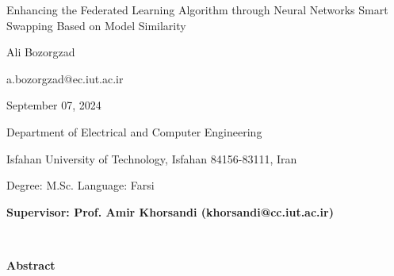 \thispagestyle{empty}

\begin{latin}
\begin{center}

{\huge
Enhancing the Federated Learning Algorithm through Neural Networks Smart Swapping Based on Model Similarity
}

\vspace{1cm}

{\LARGE{Ali Bozorgzad}}

\vspace{0.2cm}

{\small a.bozorgzad@ec.iut.ac.ir}

\vspace{0.5cm}

September 07, 2024

\vspace{0.5cm}

Department of Electrical and Computer Engineering

\vspace{0.2cm}

Isfahan University of Technology, Isfahan 84156-83111, Iran

\vspace{0.2cm}

Degree: M.Sc. \hspace*{3cm} Language: Farsi

\vspace{1cm}

{\small\textbf{Supervisor: Prof. Amir Khorsandi (khorsandi@cc.iut.ac.ir)}}
\end{center}
~\vfill



\noindent\textbf{Abstract}


\end{latin}
